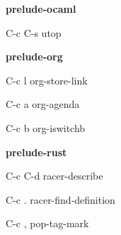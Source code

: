 \documentclass[10pt]{article}
\renewcommand\subsection[1]{\smallskip\par\textbf{\color{heading}#1}}
\begin{document}
\begin{multicols}{4}
  \subsection{prelude-ocaml}
  \begin{keylist}
  \item[C-c C-s] utop
  \end{keylist}

  \subsection{prelude-org}
  \begin{keylist}
  \item[C-c l] org-store-link
  \item[C-c a] org-agenda
  \item[C-c b] org-iswitchb
  \end{keylist}

  \subsection{prelude-rust}
  \begin{keylist}
  \item[C-c C-d] racer-describe
  \item[C-c .] racer-find-definition
  \item[C-c ,] pop-tag-mark
  \end{keylist}

\end{multicols}
\end{document}
